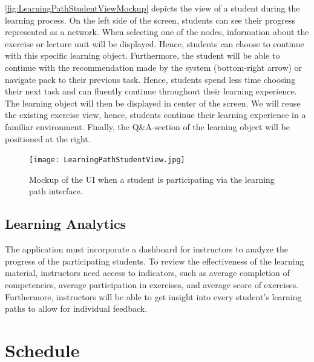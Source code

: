 \documentclass[a4paper,12pt,twoside]{article}
\begin{document}
\autoref{fig:LearningPathStudentViewMockup} depicts the view of a student during the learning process. On the left side of the screen, students can see their
progress represented as a network. When selecting one of the nodes, information about the exercise or lecture unit will be displayed. Hence, students can choose
to continue with this specific learning object. Furthermore, the student will be able to continue with the recommendation made by the system (bottom-right arrow)
or navigate pack to their previous task. Hence, students spend less time choosing their next task and can fluently
continue throughout their learning experience.
The learning object will then be displayed in center of the screen. We will reuse the existing exercise view, hence, students continue their learning experience in
a familiar environment. Finally, the Q\&A-section of the learning object will be positioned at the right.

\begin{figure}[h!]
        \centering
        \texttt{[image: LearningPathStudentView.jpg]}
        \caption{Mockup of the UI when a student is participating via the learning path interface.}
        \label{fig:LearningPathStudentViewMockup}
\end{figure}

\subsection{Learning Analytics}
The application must incorporate a dashboard for instructors to analyze the progress of the participating students. To review the effectiveness of the learning material,
instructors need access to indicators, such as average completion of competencies, average participation in exercises, and average score of exercises.
Furthermore, instructors will be able to get insight into every student's learning paths to allow for individual feedback.


\section{Schedule}
\end{document}
